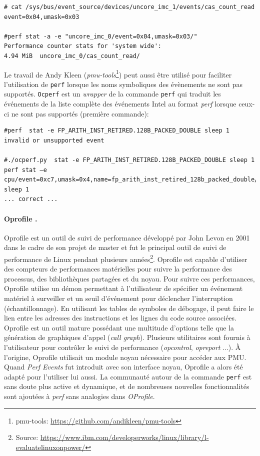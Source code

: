 \begin{verbatim}
# cat /sys/bus/event_source/devices/uncore_imc_1/events/cas_count_read
event=0x04,umask=0x03

#perf stat -a -e "uncore_imc_0/event=0x04,umask=0x03/"
Performance counter stats for 'system wide':
4.94 MiB  uncore_imc_0/cas_count_read/
\end{verbatim}

    
           Le travail de Andy Kleen (\textit{pmu-tools}\footnote{pmu-tools: \url{https://github.com/andikleen/pmu-tools}}) peut aussi être utilisé pour faciliter l'utilisation de \verb=perf= lorsque les noms symboliques des évènements ne sont pas supportés. \verb=Ocperf= est un \textit{wrapper} de la commande \verb=perf= qui traduit les événements de la liste complète des événements Intel au format \textit{perf} lorsque ceux-ci ne sont pas supportés (première commande):

\begin{verbatim}
#perf  stat -e FP_ARITH_INST_RETIRED.128B_PACKED_DOUBLE sleep 1
invalid or unsupported event

#./ocperf.py  stat -e FP_ARITH_INST_RETIRED.128B_PACKED_DOUBLE sleep 1
perf stat –e cpu/event=0xc7,umask=0x4,name=fp_arith_inst_retired_128b_packed_double/ sleep 1
... correct ...
\end{verbatim}
        
        \paragraph{Oprofile \cite{Levon2004}.} 
            
            Oprofile \cite{Levon2004} est un outil de suivi de performance développé par John Levon en 2001 dans le cadre de son projet de master et fut le principal outil de suivi de performance de Linux pendant plusieurs années\footnote{Source: \url{https://www.ibm.com/developerworks/linux/library/l-evaluatelinuxonpower/}}. 
            Oprofile est capable d'utiliser des compteurs de performances matérielles pour suivre la performance des processus, des bibliothèques partagées et du noyau. Pour suivre ces performances, Oprofile utilise un démon permettant à l'utilisateur de spécifier un événement matériel à surveiller et un seuil d'événement pour déclencher l'interruption (échantillonnage). En utilisant les tables de symboles de débogage, il peut faire le lien entre les adresses des instructions et les lignes du code source associées. Oprofile est un outil mature possédant une multitude d'options telle que la génération de graphiques d'appel (\textit{call graph}). Plusieurs utilitaires sont fournis à l'utilisateur pour contrôler le suivi de performance (\textit{opcontrol}, \textit{opreport} ...).
            À l'origine, Oprofile utilisait un module noyau nécessaire pour accéder aux PMU. Quand \textit{Perf Events} fut introduit avec son interface noyau, Oprofile a alors été adapté pour l'utiliser lui aussi. La communauté autour de la commande \verb|perf| est sans doute plus active et dynamique, et de nombreuses nouvelles fonctionnalités sont ajoutées à \textit{perf} sans analogies dans \textit{OProfile}.
 

